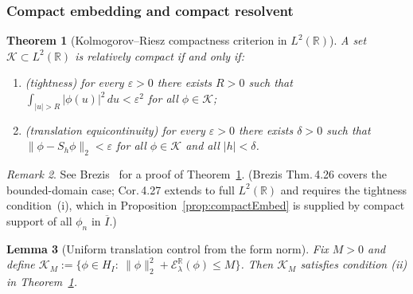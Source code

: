\documentclass[11pt]{article}
\newtheorem{theorem}{Theorem}
\newtheorem{lemma}[theorem]{Lemma}
\theoremstyle{remark}
\newtheorem{remark}[theorem]{Remark}
\newcommand{\R}{\mathbb R}
\newcommand{\1}{\mathbf 1}
\begin{document}
\subsubsection{Compact embedding and compact resolvent}

\begin{theorem}[Kolmogorov--Riesz compactness criterion in $L^2(\R)$]\label{thm:KR}
A set $\mathcal K\subset L^2(\R)$ is relatively compact if and only if:
\begin{enumerate}
\item[(i)] (\emph{tightness}) for every $\varepsilon>0$ there exists $R>0$ such that
$\int_{|u|>R}|\phi(u)|^2\,du<\varepsilon^2$ for all $\phi\in\mathcal K$;
\item[(ii)] (\emph{translation equicontinuity}) for every $\varepsilon>0$ there exists $\delta>0$ such that
$\|\phi-S_h\phi\|_{2}<\varepsilon$ for all $\phi\in\mathcal K$ and all $|h|<\delta$.
\end{enumerate}
\end{theorem}

\begin{remark}
See Brezis~\cite[Cor.~4.27]{BrezisFA} for a proof of Theorem~\ref{thm:KR}.
(Brezis Thm.\,4.26 covers the bounded-domain case; Cor.\,4.27 extends to full $L^2(\mathbb{R})$
and requires the tightness condition~(i), which in Proposition~\ref{prop:compactEmbed}
is supplied by compact support of all $\phi_n$ in $\overline{I}$.)
\end{remark}

\begin{lemma}[Uniform translation control from the form norm]\label{lem:trans}
Fix $M>0$ and define
$\mathcal K_M:=\{\phi\in H_I:\ \|\phi\|_2^2+\mathcal E_\lambda^{\R}(\phi)\le M\}$.
Then $\mathcal K_M$ satisfies condition (ii) in Theorem~\ref{thm:KR}.
\end{lemma}
\end{document}
